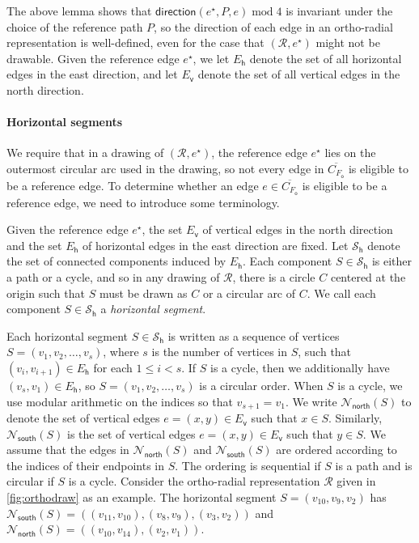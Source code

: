 \documentclass{theoretics}
\newcommand{\RR}{\mathcal{R}}
\newcommand{\FO}{F_\mathsf{o}}
\newcommand{\EH}{E_\mathsf{h}}
\newcommand{\EV}{E_\mathsf{v}}
\newcommand{\PH}{\mathcal{S}_\mathsf{h}}
\newcommand{\Nnorth}{\mathcal{N}_\mathsf{north}}
\newcommand{\Nsouth}{\mathcal{N}_\mathsf{south}}
\newcommand{\direction}{\mathsf{direction}}
\newcommand{\eref}{e^\star}
\renewcommand{\mod}{\operatorname{mod}}
\begin{document}
The above lemma shows that $\direction(\eref, P, e) \mod 4$ is invariant under the choice of the reference path $P$, so the direction of each edge in an ortho-radial representation is well-defined, even for the case that  $(\RR, \eref)$ might not be drawable. Given the reference edge $\eref$, we let $\EH$ denote the set of all horizontal edges in the east direction, and let $\EV$ denote the set of all vertical edges in the north direction.



\paragraph{Horizontal segments} 
We require that in a drawing of $(\RR, \eref)$, the reference edge $\eref$ lies on the outermost circular arc used in the drawing, so not every edge in $\overline{C_{\FO}}$ is eligible to be a reference edge. To determine whether an edge $e \in \overline{C_{\FO}}$ is eligible to be a reference edge, we need to introduce some terminology.

Given the reference edge $\eref$, the set $\EV$ of vertical edges in the north direction  and the set $\EH$ of horizontal edges in the east direction  are fixed.
Let $\PH$ denote the set of connected components induced by $\EH$. Each component $S \in \PH$ is either a path or a cycle, and so in any drawing of $\RR$, there is a circle $C$ centered at the origin such that $S$ must be drawn as $C$ or a circular arc of $C$. We call each component $S \in \PH$ a \emph{horizontal segment}.

Each horizontal segment $S \in \PH$ is written as a sequence of vertices $S=(v_1, v_2, \ldots, v_s)$, where $s$ is the number of vertices in $S$, such that $(v_i, v_{i+1}) \in \EH$ for each $1 \leq i < s$. If $S$ is a cycle, then we additionally have $(v_s, v_1) \in \EH$, so $S=(v_1, v_2, \ldots, v_s)$ is a circular order. When $S$ is a cycle, we use modular arithmetic on the indices so that $v_{s+1} = v_1$.
We write $\Nnorth(S)$ to denote the set of vertical edges $e = (x,y) \in \EV$ such that $x \in S$. Similarly, $\Nsouth(S)$ is the set of vertical edges $e = (x,y) \in \EV$ such that $y \in S$. We assume that the edges  in $\Nnorth(S)$ and $\Nsouth(S)$ are ordered according to the indices of their endpoints in $S$. The ordering is sequential if $S$ is a path and is circular if $S$ is a cycle. 
Consider the ortho-radial representation $\RR$ given in \cref{fig:orthodraw} as an example. The horizontal segment $S = (v_{10}, v_9, v_2)$ has $\Nsouth(S) = ((v_{11}, v_{10}), (v_8, v_9), (v_3, v_2))$ and $\Nnorth(S) = ((v_{10}, v_{14}), (v_2 ,v_1))$.
\end{document}

